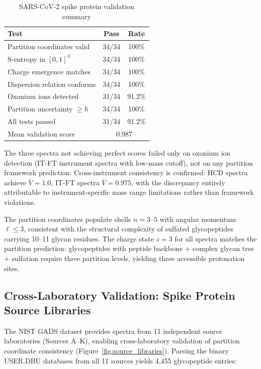 \documentclass[twocolumn,10pt,a4paper]{article}
\theoremstyle{definition}
\theoremstyle{remark}
\begin{document}
\begin{table}[H]
\centering
\caption{SARS-CoV-2 spike protein validation summary}
\label{tab:spike}
\small
\begin{tabular}{lcc}
\toprule
\textbf{Test} & \textbf{Pass} & \textbf{Rate} \\
\midrule
Partition coordinates valid & 34/34 & 100\% \\
S-entropy in $[0,1]^3$ & 34/34 & 100\% \\
Charge emergence matches & 34/34 & 100\% \\
Dispersion relation conforms & 34/34 & 100\% \\
Oxonium ions detected & 31/34 & 91.2\% \\
Partition uncertainty $\geq \hbar$ & 34/34 & 100\% \\
\midrule
All tests passed & 31/34 & 91.2\% \\
Mean validation score & \multicolumn{2}{c}{0.987} \\
\bottomrule
\end{tabular}
\end{table}

The three spectra not achieving perfect scores failed only on oxonium ion detection (IT-FT instrument spectra with low-mass cutoff), not on any partition framework prediction. Cross-instrument consistency is confirmed: HCD spectra achieve $\bar{V} = 1.0$, IT-FT spectra $\bar{V} = 0.975$, with the discrepancy entirely attributable to instrument-specific mass range limitations rather than framework violations.

The partition coordinates populate shells $n = 3$--$5$ with angular momentum $\ell \leq 3$, consistent with the structural complexity of sulfated glycopeptides carrying 10--11 glycan residues. The charge state $z = 3$ for all spectra matches the partition prediction: glycopeptides with peptide backbone + complex glycan tree + sulfation require three partition levels, yielding three accessible protonation sites.

\subsection{Cross-Laboratory Validation: Spike Protein Source Libraries}
\label{sec:sources}

The NIST GADS dataset provides spectra from 11 independent source laboratories (Sources A--K), enabling cross-laboratory validation of partition coordinate consistency (Figure~\ref{fig:source_libraries}). Parsing the binary USER.DBU databases from all 11 sources yields 4,455 glycopeptide entries:
\end{document}
